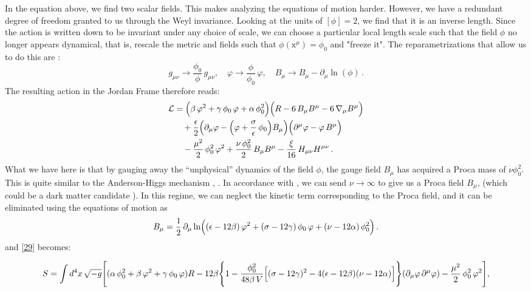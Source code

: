 \documentclass[aps,prd,reprint,preprintnumbers,showpacs,floatfix,nofootinbib,superscript address]{revtex4-2}
\begin{document}
In the equation above, we find two scalar fields. This makes analyzing the equations of motion harder. However, we have a redundant degree of freedom granted to us through the Weyl invariance. Looking at the units of $[\phi] = 2$, we find that it is an inverse length. Since the action is written down to be invariant under any choice of scale, we can choose a particular local length scale such that the field $\phi$ no longer appears dynamical, that is, rescale the metric and fields such that $\phi(\text{x}^\mu) = \phi_0$ and "freeze it". The reparametrizations that allow us to do this are :
\[
g_{\mu \nu}\rightarrow\frac{\phi_0}{\phi}\,g_{\mu \nu},\quad 
\varphi\rightarrow\frac{\phi}{\phi_0}\,\varphi,\quad 
B_{\mu}\rightarrow B_{\mu} - \partial_{\mu}\ln(\phi)\,.
\] 
The resulting action in the Jordan Frame therefore reads:
\begin{equation}\label{29}
\begin{aligned}
\mathcal{L} &= \Bigl(\beta\, \varphi^2 + \gamma\, \phi_0\, \varphi + \alpha\, \phi_0^2\Bigr)
\Bigl(R - 6\, B_{\mu} B^{\mu} - 6\, \nabla_{\mu} B^\mu\Bigr) \\
&\quad + \frac{\epsilon}{2} \Bigl(\partial_{\mu}\varphi - \Bigl(\varphi + \frac{\sigma}{\epsilon}\,\phi_0\Bigr)B_{\mu}\Bigr)
\Bigl(\partial^{\mu}\varphi - \varphi\,B^{\mu}\Bigr) \\
&\quad - \frac{\mu^2}{2}\, \phi_0^2\,\varphi^2 
+ \frac{\nu\,\phi_0^2}{2}\,B_{\mu} B^{\mu} 
- \frac{\xi}{16}\,H_{\mu\nu} H^{\mu\nu}\,.
\end{aligned}
\end{equation}
What we have here is that by gauging away the ``unphysical'' dynamics of the field $\phi$, the gauge field $B_\mu$ has acquired a Proca mass of $\nu \phi_0^2$. This is quite similar to the Anderson-Higgs mechanism \cite{anderson_plasmons_1963}, \cite{higgs_broken_1964}. In accordance with \cite{barker2024poincaregaugetheoryconformal}, we can send $\nu \rightarrow \infty$ to give us a Proca field $B_\mu$, (which could be a dark matter candidate \cite{Lasenby_2016}). In this regime, we can neglect the kinetic term corresponding to the Proca field, and it can be eliminated using the equations of motion as
\begin{equation}\label{30}
B_\mu = \frac{1}{2}\,\partial_\mu \ln\Bigl((\epsilon-12\beta)\,\varphi^2 + (\sigma-12\gamma)\,\phi_0\,\varphi + (\nu-12\alpha)\,\phi_0^2\Bigr)\,.
\end{equation}
and \ref{29} becomes:
\begin{widetext}
\begin{subequations}\label{33a}
\begin{align}
S = \int d^4x\, \sqrt{-g} \Biggl[ (\alpha\, \phi_0^2 + \beta\, \varphi^2 + \gamma\, \phi_0\,\varphi)R - 12\beta \Biggl\{1 - \frac{\phi_0^2}{48\beta\, V}\Bigl[(\sigma-12\gamma)^2 - 4(\epsilon-12\beta)(\nu-12\alpha)\Bigr]\Biggr\}
(\partial_{\mu}\varphi\, \partial^{\mu}\varphi) - \frac{\mu^2}{2}\,\phi_0^2\,\varphi^2 \Biggr],
\end{align}
\end{subequations}
\end{widetext}
\end{document}
